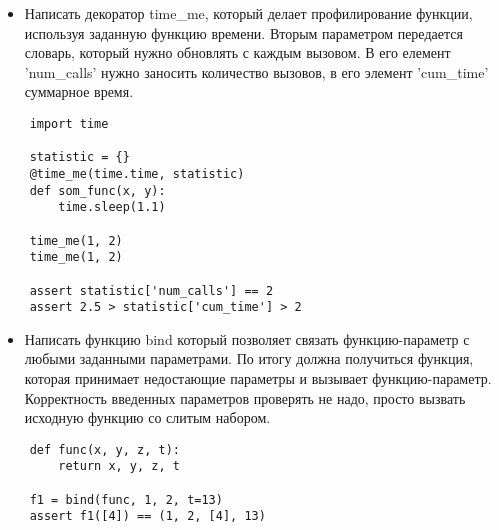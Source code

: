 \documentclass{article}
\begin{document}
\begin{itemize}
	\item Написать декоратор time\_me, который делает профилирование функции, 
		используя заданную функцию времени. Вторым параметром передается словарь,
		который нужно обновлять с каждым вызовом. В его елемент 'num\_calls' нужно
		заносить количество вызовов, в его элемент 'cum\_time' суммарное время.
\end{itemize}
\vspace{15pt}
\begin{lstlisting}
	import time

	statistic = {}
	@time_me(time.time, statistic)
	def som_func(x, y):
		time.sleep(1.1)

	time_me(1, 2)
	time_me(1, 2)

	assert statistic['num_calls'] == 2
	assert 2.5 > statistic['cum_time'] > 2
\end{lstlisting}
\newpage

\begin{itemize}
	\item Написать функцию bind который позволяет связать функцию-параметр с любыми заданными 
		параметрами. По итогу должна получиться функция, которая принимает недостающие параметры
		и вызывает функцию-параметр. Корректность введенных параметров проверять не надо, просто 
		вызвать исходную функцию со слитым набором.
\end{itemize}
\vspace{15pt}
\begin{lstlisting}
	def func(x, y, z, t):
		return x, y, z, t

	f1 = bind(func, 1, 2, t=13)
	assert f1([4]) == (1, 2, [4], 13)
\end{lstlisting}
\newpage
\end{document}
